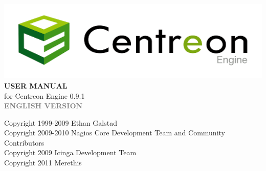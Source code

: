\documentclass[a4paper]{book}
\begin{document}
\begin{titlepage}
\vspace*{1.5cm}
\begin{center}
\mbox{\includegraphics[width=\linewidth]{centreon_logo}}
\vspace*{2cm}
{\fontsize{16}{16} \bf USER MANUAL }\\
{\large for Centreon Engine 0.9.1 }\\
\vspace*{0.5cm}
{\textcolor{gray}{\large \bf ENGLISH VERSION }}\\
\vspace*{6cm}
\end{center}
\end{titlepage}
{\small Copyright 1999-2009 Ethan Galstad\\Copyright 2009-2010 Nagios Core Development Team and Community Contributors\\Copyright 2009 Icinga Development Team\\Copyright 2011 Merethis}\\
\clearemptydoublepage
{}
\tableofcontents
\clearemptydoublepage
{}
\end{document}
